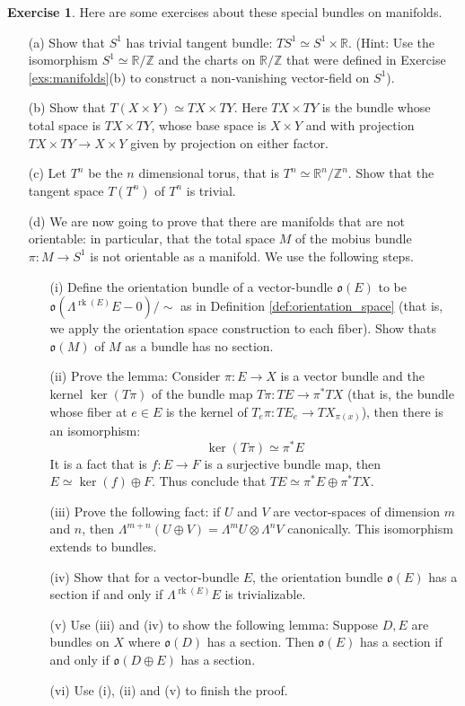 \documentclass[12pt]{article}
\theoremstyle{definition}
\newtheorem{exercise}[theorem]{Exercise}
\numberwithin{equation}{section}
\newcommand{\R}{{\mathbb R}}
\newcommand{\Z}{{\mathbb Z}}
\newcommand{\op}{\operatorname}
\begin{document}
\begin{exercise} Here are some exercises about these special bundles on manifolds.

\begin{itemize}
	\item[(a)] Show that $S^1$ has trivial tangent bundle: $TS^1 \simeq S^1 \times \R$. (Hint: Use the isomorphism $S^1 \simeq \R/\Z$ and the charts on $\R/\Z$ that were defined in Exercise \ref{exs:manifolds}(b) to construct a non-vanishing vector-field on $S^1$).
	\item[(b)] Show that $T(X \times Y) \simeq TX \times TY$. Here $TX \times TY$ is the bundle whose total space is $TX \times TY$, whose base space is $X \times Y$ and with projection $TX \times TY \to X \times Y$ given by projection on either factor.
	\item[(c)] Let $T^n$ be the $n$ dimensional torus, that is $T^n \simeq \R^n/\Z^n$. Show that the tangent space $T(T^n)$ of $T^n$ is trivial.
	\item[(d)] We are now going to prove that there are manifolds that are not orientable: in particular, that the total space $M$ of the mobius bundle $\pi:M \to S^1$ is not orientable as a manifold. We use the following steps.
	\begin{itemize}
		\item[(i)] Define the orientation bundle of a vector-bundle $\mathfrak{o}(E)$ to be $\mathfrak{o}(\Lambda^{\op{rk}(E)} E - 0)/\sim$ as in Definition \ref{def:orientation_space} (that is, we apply the orientation space construction to each fiber). Show thats $\mathfrak{o}(M)$ of $M$ as a bundle has no section.
		\item[(ii)] Prove the lemma: Consider $\pi:E \to X$ is a vector bundle and the kernel $\op{ker}(T\pi)$ of the bundle map $T\pi:TE \to \pi^*TX$ (that is, the bundle whose fiber at $e \in E$ is the kernel of $T_e\pi:TE_e \to TX_{\pi(x)}$), then there is an isomorphism:
		\[
		\op{ker}(T\pi) \simeq \pi^*E
		\]
		 It is a fact that is $f:E \to F$ is a surjective bundle map, then $E \simeq \op{ker}(f) \oplus F$. Thus conclude that $TE \simeq \pi^*E \oplus \pi^*TX$.
		 \item[(iii)] Prove the following fact: if $U$ and $V$ are vector-spaces of dimension $m$ and $n$, then $\Lambda^{m+n}(U \oplus V) = \Lambda^m U \otimes \Lambda^n V$ canonically. This isomorphism extends to bundles.
		 \item[(iv)] Show that for a vector-bundle $E$, the orientation bundle $\mathfrak{o}(E)$ has a section if and only if $\Lambda^{\op{rk}(E)}E$ is trivializable.
		 \item[(v)] Use (iii) and (iv) to show the following lemma: Suppose $D,E$ are bundles on $X$ where $\mathfrak{o}(D)$ has a section. Then $\mathfrak{o}(E)$ has a section if and only if $\mathfrak{o}(D \oplus E)$ has a section.
		 \item[(vi)] Use (i), (ii) and (v) to finish the proof.
		 \end{itemize}
\end{itemize}

\end{exercise}
\end{document}
